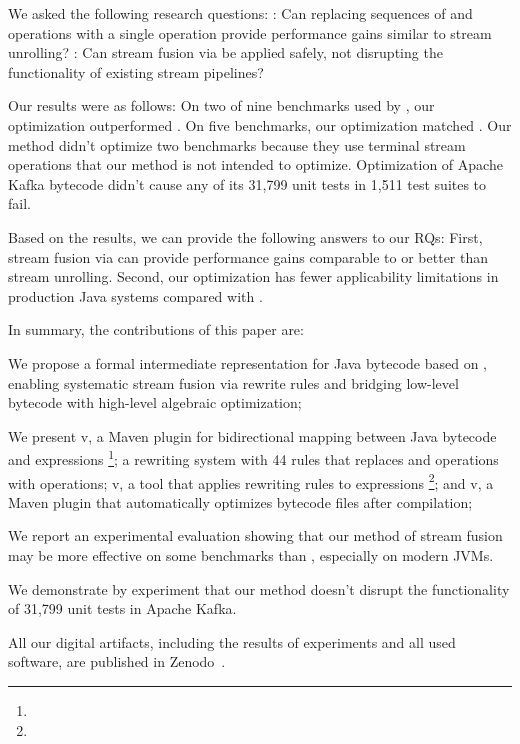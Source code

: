 We asked the following research questions:
: Can replacing sequences of  and  operations with a single  operation provide performance gains similar to stream unrolling?
: Can stream fusion via  be applied safely, not disrupting the functionality of existing stream pipelines?

Our results were as follows:
On two of nine benchmarks used by \citet{moller2020eliminating}, our optimization outperformed \streamliner{}.
On five benchmarks, our optimization matched \streamliner{}.
Our method didn't optimize two benchmarks because they use terminal stream operations that our method is not intended to optimize.
Optimization of Apache Kafka bytecode didn't cause any of its 31,799 unit tests in 1,511 test suites to fail.

Based on the results, we can provide the following answers to our RQs:
First, stream fusion via  can provide performance gains comparable to or better than stream unrolling.
Second, our optimization has fewer applicability limitations in production Java systems compared with \streamliner{}.

In summary, the contributions of this paper are:
\begin{inparaenum}[1)]
  \item We propose a formal intermediate representation for Java bytecode based on \phic{}, enabling systematic stream fusion via rewrite rules and bridging low-level bytecode with high-level algebraic optimization;
  \item We present \jeo{} v, a Maven plugin for bidirectional mapping between Java bytecode and \phic{} expressions%
      \footnote{};
    a rewriting system with 44 rules that replaces  and  operations with  operations;
    \phino{} v, a tool that applies rewriting rules to \phic{} expressions%
      \footnote{};
    and \hone{} v, a Maven plugin that automatically optimizes bytecode  files after compilation;
  \item We report an experimental evaluation showing that our method of stream fusion
    may be more effective on some benchmarks than \streamliner{}, especially on modern JVMs.
  \item We demonstrate by experiment that our method doesn't disrupt
    the functionality of 31,799 unit tests in Apache Kafka.
\end{inparaenum}

All our digital artifacts, including the results of experiments and all used software, are published in Zenodo~\cite{zenodo2026}.

